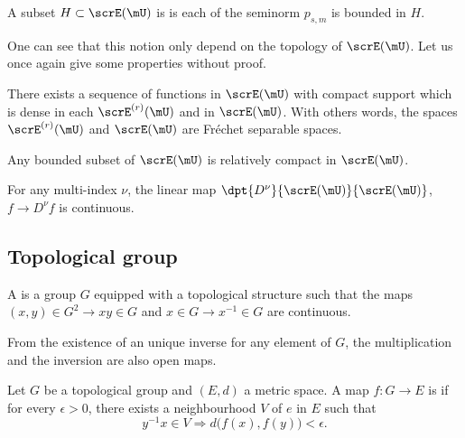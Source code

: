 \begin{definition}
A subset $H\subset\scrE(\mU)$ is  is each of the seminorm $p_{s,m}$ is bounded in $H$.
\label{def:bounded}
\end{definition}
One can see that this notion only depend on the topology of $\scrE(\mU)$. Let us once again give some properties without proof.

\begin{proposition}
There exists a sequence of functions in $\scrE(\mU)$ with compact support which is dense in each $\scrE^{(r)}(\mU)$ and in $\scrE(\mU)$. With others words, the spaces $\scrE^{(r)}(\mU)$ and $\scrE(\mU)$ are Fréchet separable spaces.
\label{prop:E_Frechet}
\end{proposition}

\begin{proposition}
Any bounded subset of $\scrE(\mU)$ is relatively compact in $\scrE(\mU)$.
\end{proposition}

\begin{proposition}
For any multi-index $\nu$, the linear map $\dpt{D^{\nu}}{\scrE(\mU)}{\scrE(\mU)}$, $f\to D^{\nu}f$ is continuous.
\end{proposition}

\subsection{Topological group}


\begin{definition}      \label{DEFooCHZVooHnvSgW}
    A  is a group $G$ equipped with a topological structure such that the maps $(x,y)\in G^2\to xy\in G$ and $x\in G\to x^{-1}\in G$ are continuous.
\end{definition}

\begin{remark}\label{rem:ouvert}
From the existence of an unique inverse for any element of $G$, the multiplication and the inversion are also open maps.
\end{remark}

\begin{definition}      \label{DEFooUEBTooDqipcL}
    Let \( G\) be a topological group and \( (E,d)\) a metric space. A map \( f\colon G\to E\) is  if for every \( \epsilon>0\), there exists a neighbourhood \( V\) of \( e\) in \( E\) such that
    \begin{equation}
        y^{-1}x\in V\Rightarrow d\big( f(x),f(y) \big)<\epsilon.
    \end{equation}
\end{definition}

